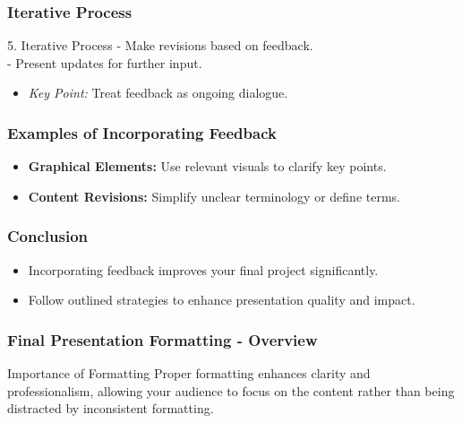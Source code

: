 \documentclass[aspectratio=169]{beamer}
\begin{document}
\begin{frame}[fragile]
    \frametitle{Iterative Process}
    \begin{block}{5. Iterative Process}
        - Make revisions based on feedback.\\
        - Present updates for further input.
        \begin{itemize}
            \item \textit{Key Point:} Treat feedback as ongoing dialogue.
        \end{itemize}
    \end{block}
\end{frame}

\begin{frame}[fragile]
    \frametitle{Examples of Incorporating Feedback}
    \begin{itemize}
        \item \textbf{Graphical Elements:} Use relevant visuals to clarify key points.
        \item \textbf{Content Revisions:} Simplify unclear terminology or define terms.
    \end{itemize}
\end{frame}

\begin{frame}[fragile]
    \frametitle{Conclusion}
    \begin{itemize}
        \item Incorporating feedback improves your final project significantly.
        \item Follow outlined strategies to enhance presentation quality and impact.
    \end{itemize}
\end{frame}

\begin{frame}[fragile]
    \frametitle{Final Presentation Formatting - Overview}
    \begin{block}{Importance of Formatting}
        Proper formatting enhances clarity and professionalism, allowing your audience to focus on the content rather than being distracted by inconsistent formatting.
    \end{block}
\end{frame}
\end{document}
